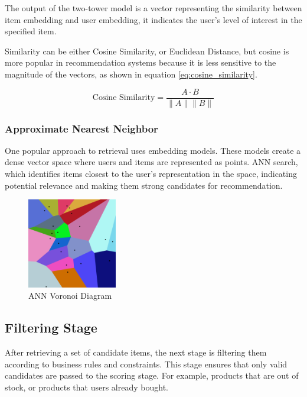 The output of the two-tower model is a vector representing the similarity between item embedding and user embedding, 
it indicates the user's level of interest in the specified item.

Similarity can be either Cosine Similarity, or Euclidean Distance, but cosine is more popular in recommendation systems because it is less sensitive to the magnitude of the vectors, as shown in equation \ref{eq:cosine_similarity}.

\begin{equation}
    \text{Cosine Similarity} = \frac{A \cdot B}{\|A\| \|B\|}
    \label{eq:cosine_similarity}
\end{equation}


\subsubsection{Approximate Nearest Neighbor}

One popular approach to retrieval uses embedding models. 
These models create a dense vector space where users and items are represented as points.
ANN search,
which identifies items closest to the user's representation in the space, 
indicating potential relevance and making them strong candidates for recommendation.


\begin{figure}[H]
    \centering
    \includegraphics[width=0.35\textwidth]{assets/ann.png}
    \caption[ANN Voronoi Diagram]{ANN Voronoi Diagram \cite{AnnVoronoi}}
    \label{fig:AnnVoronoi}
\end{figure}


\subsection{Filtering Stage}

After retrieving a set of candidate items, the next stage is filtering them according to business rules and constraints.
This stage ensures that only valid candidates are passed to the scoring stage.
For example, products that are out of stock, or products that users already bought.

